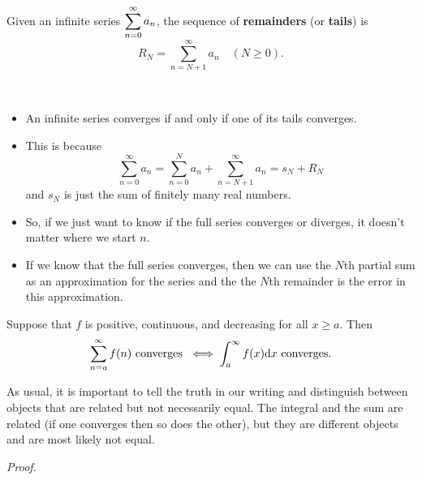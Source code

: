 

\begin{definition}
Given an infinite series $\displaystyle\sum_{n=0}^\infty a_n$, the sequence of \textbf{remainders} (or \textbf{tails}) is
\begin{equation*}
R_N = \sum_{n=N+1}^\infty a_n \quad (N\ge 0).
\end{equation*}
\end{definition}

\begin{remark}\,
\begin{itemize}
\item An infinite series converges if and only if one of its tails converges.
 \item This is because 
 \begin{equation*}
 \sum_{n=0}^\infty a_n = \sum_{n=0}^N a_n + \sum_{n=N+1}^\infty a_n = s_N + R_N
 \end{equation*}
 and $s_N$ is just the sum of finitely many real numbers.
 \item So, if we just want to know if the full series converges or diverges, it doesn't matter where we start $n$.
 \item If we know that the full series converges, then we can use the $N$th partial sum as an approximation for the series and the the $N$th remainder is the error in this approximation.
 \end{itemize}
\end{remark}

\newpage

\begin{theorem}
Suppose that $f$ is positive, continuous, and decreasing for all $x\ge a$.
Then
\begin{equation*}
\sum_{n=a}^\infty f(n) \text{ converges }\iff \int_a^\infty f(x)\mathrm{d} x \text{ converges.}
\end{equation*}
\end{theorem}
\begin{remark}
As usual, it is important to tell the truth in our writing and distinguish between objects that are related but not necessarily equal.
The integral and the sum are related (if one converges then so does the other), but they are different objects and are most likely not equal.
\end{remark}
\textit{Proof.}

